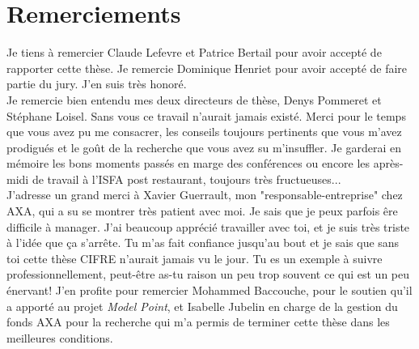 \chapter*{Remerciements}
 





Je tiens à remercier Claude Lefevre et Patrice Bertail pour avoir accepté de rapporter cette thèse. Je remercie Dominique Henriet pour avoir accepté de faire partie du jury. J'en suis très honoré.\\

Je remercie bien entendu mes deux directeurs de thèse, Denys Pommeret et Stéphane Loisel. Sans vous ce travail n'aurait jamais existé. Merci pour le temps que vous avez pu me consacrer, les conseils toujours pertinents que vous m'avez prodigués et le goût de la recherche que vous avez su m'insuffler. Je garderai en mémoire les bons moments passés en marge des conférences ou encore les après-midi de travail à l'ISFA post restaurant, toujours très fructueuses...\\

J'adresse un grand merci à Xavier Guerrault, mon "responsable-entreprise" chez AXA, qui a su se montrer très patient avec moi. Je sais que je peux parfois êre difficile à manager. J'ai beaucoup apprécié travailler avec toi, et je suis très triste à l'idée que ça s'arrête. Tu m'as fait confiance jusqu'au bout et je sais que sans toi cette thèse CIFRE n'aurait jamais vu le jour. Tu es un exemple à suivre professionnellement, peut-être as-tu raison un peu trop souvent ce qui est un peu énervant! J'en profite pour remercier Mohammed Baccouche, pour le soutien qu'il a apporté au projet \textit{Model Point}, et Isabelle Jubelin en charge de la gestion du fonds AXA pour la recherche qui m'a permis de terminer cette thèse dans les meilleures conditions.\\

